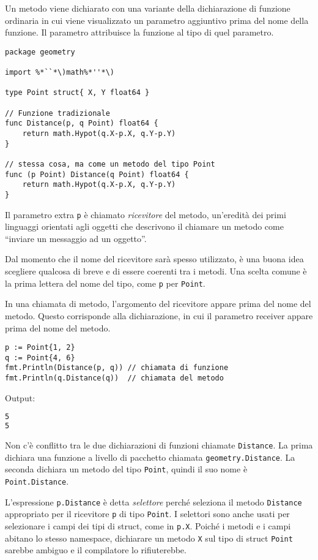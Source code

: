 Un metodo viene dichiarato con una variante della dichiarazione di funzione ordinaria in cui viene visualizzato un parametro aggiuntivo prima del nome della funzione.
Il parametro attribuisce la funzione al tipo di quel parametro.
\begin{lstlisting}[frame=single, label={lst:lstlisting5-1.1}]
package geometry

import %*``*\)math%*''*\)

type Point struct{ X, Y float64 }

// Funzione tradizionale
func Distance(p, q Point) float64 {
    return math.Hypot(q.X-p.X, q.Y-p.Y)
}

// stessa cosa, ma come un metodo del tipo Point
func (p Point) Distance(q Point) float64 {
    return math.Hypot(q.X-p.X, q.Y-p.Y)
}
\end{lstlisting}
Il parametro extra \verb|p| è chiamato \textit{ricevitore} del metodo, un'eredità dei primi linguaggi orientati agli oggetti che descrivono il chiamare un metodo come ``inviare un messaggio ad un oggetto''.

Dal momento che il nome del ricevitore sarà spesso utilizzato, è una buona idea scegliere qualcosa di breve e di essere coerenti tra i metodi.
Una scelta comune è la prima lettera del nome del tipo, come \verb|p| per \verb|Point|.

In una chiamata di metodo, l'argomento del ricevitore appare prima del nome del metodo.
Questo corrisponde alla dichiarazione, in cui il parametro receiver appare prima del nome del metodo.
\begin{lstlisting}[frame=single, label={lst:lstlisting5-1.2}]
p := Point{1, 2}
q := Point{4, 6}
fmt.Println(Distance(p, q)) // chiamata di funzione
fmt.Println(q.Distance(q))  // chiamata del metodo
\end{lstlisting}
Output:
\begin{lstlisting}[language=bash, frame=L, label={lst:lstlisting5-1.3}]
5
5
\end{lstlisting}
Non c'è conflitto tra le due dichiarazioni di funzioni chiamate \verb|Distance|.
La prima dichiara una funzione a livello di pacchetto chiamata \verb|geometry.Distance|.
La seconda dichiara un metodo del tipo \verb|Point|, quindi il suo nome è \verb|Point.Distance|.

L'espressione \verb|p.Distance| è detta \textit{selettore} perché seleziona il metodo \verb|Distance| appropriato per il ricevitore \verb|p| di tipo \verb|Point|.
I selettori sono anche usati per selezionare i campi dei tipi di struct, come in \verb|p.X|.
Poiché i metodi e i campi abitano lo stesso namespace, dichiarare un metodo \verb|X| sul tipo di struct \verb|Point| sarebbe ambiguo e il compilatore lo rifiuterebbe.

